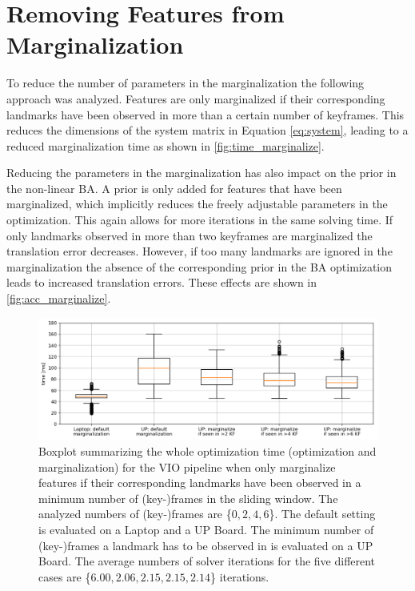 \section{Removing Features from Marginalization}\label{sec:remove_marginalize}
To reduce the number of parameters in the marginalization the following 
approach was analyzed. Features are only marginalized if their 
corresponding landmarks have been observed in more than a certain number of 
keyframes. This reduces the dimensions of the system matrix in Equation 
\eqref{eq:system}, leading to a reduced marginalization time as shown in 
\autoref{fig:time_marginalize}. 

Reducing the parameters in the marginalization has also impact on the prior in 
the non-linear \ac{BA}. A prior is only added for features that have been 
marginalized, which implicitly reduces the freely adjustable parameters in the 
optimization. This again allows for more iterations in the same solving time. If 
only landmarks observed in more than two keyframes are marginalized the 
translation error decreases. However, if too many landmarks are ignored in the
marginalization the absence of the corresponding prior in the \ac{BA} 
optimization leads to increased translation errors. These effects are shown in 
\autoref{fig:acc_marginalize}.
\begin{figure}[H]
\centering
\includegraphics[width=1\textwidth]{images/time_marginalize}
\caption{Boxplot summarizing the whole optimization time (optimization and 
marginalization) for the \ac{VIO} pipeline when only marginalize features if 
their corresponding landmarks have been observed in a minimum 
number of (key-)frames in the sliding window. The analyzed numbers of 
(key-)frames are \{$0, 2, 4, 6$\}. The default setting is evaluated on a Laptop 
and a UP Board. The minimum number of (key-)frames a landmark has to be 
observed in is evaluated on a UP Board. The average numbers of solver 
iterations for the five different cases are \{$6.00, 2.06, 2.15, 2.15, 2.14$\} 
iterations.}
\label{fig:time_marginalize}
\end{figure}
